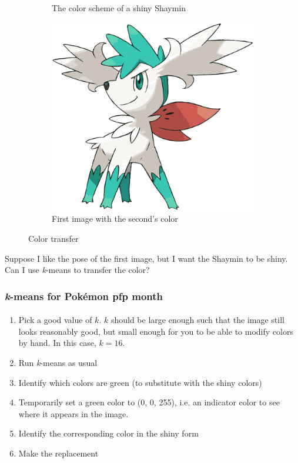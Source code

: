 \documentclass{beamer}                             %
\begin{document}
\begin{frame}
\begin{figure}[h!]
\begin{subfigure}[h]{0.32 \textwidth}
      \caption{The color scheme of a shiny Shaymin}
    \end{subfigure}
    \hfill
    \begin{subfigure}[h]{0.32 \textwidth}
      \includegraphics[scale=0.1]{shaymin.png}
      \caption{First image with the second's color}
    \end{subfigure}
    \caption{Color transfer}
\end{figure}

Suppose I like the pose of the first image, but I want the Shaymin to be shiny.
Can I use \textit{k}-means to transfer the color?
\end{frame}

\begin{frame}
\frametitle{\textit{k}-means for Pokémon pfp month}
\framesubtitle{}

\begin{enumerate}
  \item Pick a good value of \( k \). \( k \) should be large enough such that
    the image still looks reasonably good, but small enough for you to be able
    to modify colors by hand. In this case, \( k = 16 \).
  \item Run \textit{k}-means as usual
  \item Identify which colors are green (to substitute with the shiny colors) 
  \item Temporarily set a green color to (0, 0, 255),
    i.e. an indicator color to see where it appears in the image.
  \item Identify the corresponding color in the shiny form
  \item Make the replacement 
\end{enumerate}
\end{frame}
\end{document}
